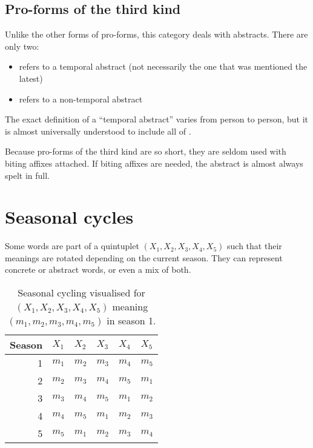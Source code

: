\documentclass{book}
\begin{document}
\subsection{Pro-forms of the third kind}

Unlike the other forms of pro-forms, this category deals with abstracts. There are only two:

\begin{itemize}
  \item {} refers to a temporal abstract (not necessarily the one that was mentioned the latest)
  \item {} refers to a non-temporal abstract
\end{itemize}

The exact definition of a ``temporal abstract'' varies from person to person, but it is almost universally understood to include all of .

Because pro-forms of the third kind are so short, they are seldom used with biting affixes attached. If biting affixes are needed, the abstract is almost always spelt in full.

\section{Seasonal cycles}

Some words are part of a quintuplet $(X_1, X_2, X_3, X_4, X_5)$ such that their meanings are rotated depending on the current season. They can represent concrete or abstract words, or even a mix of both.

\begin{table}[h]
  \caption{Seasonal cycling visualised for $(X_1, X_2, X_3, X_4, X_5)$ meaning $(m_1, m_2, m_3, m_4, m_5)$ in season 1.}
  \centering
  \begin{tabular}{r|lllll}
    Season & $X_1$ & $X_2$ & $X_3$ & $X_4$ & $X_5$ \\
    \hline
    1 & $m_1$ & $m_2$ & $m_3$ & $m_4$ & $m_5$ \\
    2 & $m_2$ & $m_3$ & $m_4$ & $m_5$ & $m_1$ \\
    3 & $m_3$ & $m_4$ & $m_5$ & $m_1$ & $m_2$ \\
    4 & $m_4$ & $m_5$ & $m_1$ & $m_2$ & $m_3$ \\
    5 & $m_5$ & $m_1$ & $m_2$ & $m_3$ & $m_4$ \\
  \end{tabular}
\end{table}
\end{document}
